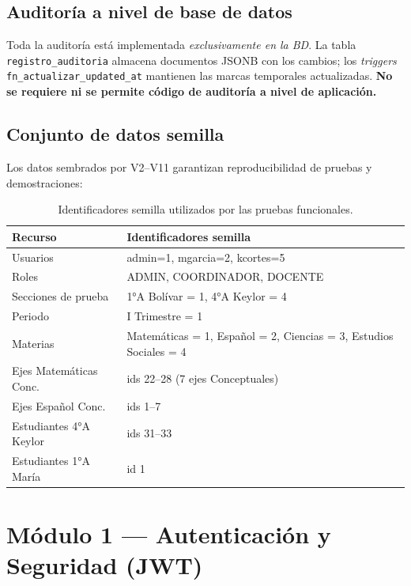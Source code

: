 \documentclass[11pt,a4paper,oneside]{article}
\newcommand{\code}[1]{\texttt{\small #1}}
\begin{document}
\subsection{Auditoría a nivel de base de datos}

Toda la auditoría está implementada \emph{exclusivamente en la BD}. La tabla
\code{registro\_auditoria} almacena documentos JSONB con los cambios; los \emph{triggers}
\code{fn\_actualizar\_updated\_at} mantienen las marcas temporales actualizadas. \textbf{No se
requiere ni se permite código de auditoría a nivel de aplicación.}

\subsection{Conjunto de datos semilla}

Los datos sembrados por V2–V11 garantizan reproducibilidad de pruebas y demostraciones:

\begin{table}[h]
\centering\renewcommand{\arraystretch}{1.15}\small
\begin{tabular}{@{}p{4.5cm} p{8.5cm}@{}}
\toprule
\textbf{Recurso} & \textbf{Identificadores semilla} \\
\midrule
Usuarios               & admin=1, mgarcia=2, kcortes=5 \\
Roles                  & ADMIN, COORDINADOR, DOCENTE \\
Secciones de prueba    & 1°A Bolívar = 1, 4°A Keylor = 4 \\
Periodo                & I Trimestre = 1 \\
Materias               & Matemáticas = 1, Español = 2, Ciencias = 3, Estudios Sociales = 4 \\
Ejes Matemáticas Conc. & ids 22--28 (7 ejes Conceptuales) \\
Ejes Español Conc.     & ids 1--7 \\
Estudiantes 4°A Keylor & ids 31--33 \\
Estudiantes 1°A María  & id 1 \\
\bottomrule
\end{tabular}
\caption{Identificadores semilla utilizados por las pruebas funcionales.}
\end{table}

\section{Módulo 1 — Autenticación y Seguridad (JWT)}
\end{document}
